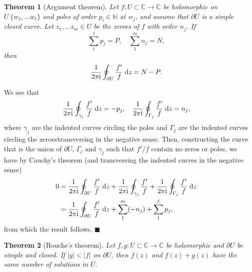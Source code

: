 \documentclass[letter-paper]{tufte-book}
\newtheorem{theorem}{\color{pastel-blue}Theorem}[section]
\newenvironment{proof}[1][Proof]{\begin{trivlist}
\item[\hskip \labelsep {\bfseries #1}]}{\end{trivlist}}
\newcommand{\zi}{{\rm i}}
\newcommand{\qed}{\hfill$\blacksquare$}
\begin{document}
\begin{theorem}[Argument theorem]
  Let $f: U \subset \mathbb{C} \to \mathbb{C}$ be holomorphic on $U \ \{w_1,
  \ldots w_\ell\}$ and poles of order $p_i\in\mathbb{N}$ at $w_j$, and assume
  that $\partial U$ is a simple closed curve. Let $z_1, \ldots z_m \in U$ be the zeroes of $f$ with order $n_j$. If
  \begin{equation*}
    \sum_1^{\ell} p_j = P, \quad \sum_1^m n_j = N,
  \end{equation*}
  then
  \begin{equation}
    \frac{1}{2\pi\zi} \oint_{\partial U} \frac{f'}{f}\; \mathrm{d}z = N - P.
  \end{equation}
\end{theorem}

\begin{proof}
  We see that
  \begin{equation*}
    \frac{1}{2\pi\zi}\oint_{\gamma_j} \frac{f'}{f}\; \mathrm{d}z = -p_j, \quad 
    \frac{1}{2\pi\zi}\oint_{\Gamma_j} \frac{f'}{f}\; \mathrm{d}z =  n_j,
  \end{equation*}
  where $\gamma_j$ are the indented curves circling the poles and $\Gamma_j$ are
  the indented curves circling the zeroestransversing in the negative sense. Then, constructing the
  curve that is the union of $\partial U$, $\Gamma_j$ and $\gamma_j$ such that
  $f'/f$ contain no zeros or poles, we have by Cauchy's theorem (and
  transversing the indented curves in the negative sense)
  \begin{align*}
    0 &= \frac{1}{2\pi\zi} \oint_{\partial U} \frac{f'}{f}\; \mathrm{d}z + \frac{1}{2\pi\zi}\oint_{\gamma_j} \frac{f'}{f} + \frac{1}{2\pi\zi}\oint_{\Gamma_j} \frac{f'}{f}\; \mathrm{d}z \\
      &= \frac{1}{2\pi\zi} \oint_{\partial U} \frac{f'}{f}\; \mathrm{d}z + \sum_1^m (-n_j) + \sum_1^\ell p_j,
  \end{align*}
  from which the result follows. \qed
\end{proof}

\begin{theorem}[Rouche's theorem]
  Let $f, g: U \subset \mathbb{C} \to \mathbb{C}$ be holomorphic and $\partial
  U$ be simple and closed. If $|g| < |f|$ on $\partial U$, then $f(z)$ and $f(z)
  + g(z)$ have the same number of solutions in $U$.
\end{theorem}
\end{document}
